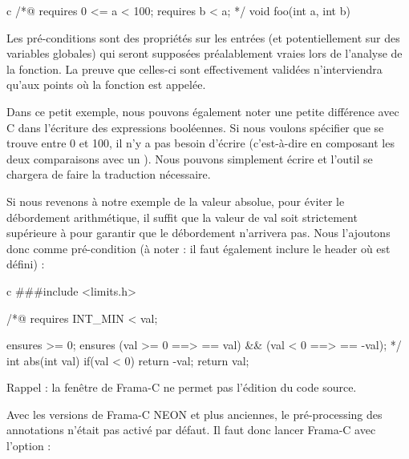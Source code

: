\documentclass[middle]{zmdocument}
\begin{document}
\begin{CodeBlock}{c}
/*@
  requires 0 <= a < 100;
  requires b < a;
*/
void foo(int a, int b){
  
}
\end{CodeBlock}



Les pré-conditions sont des propriétés sur les entrées (et potentiellement sur
des variables globales) qui seront supposées préalablement vraies lors de 
l'analyse de la fonction. La preuve que celles-ci sont effectivement validées 
n'interviendra qu'aux points où la fonction est appelée.



Dans ce petit exemple, nous pouvons également noter une petite différence avec 
C dans l'écriture des expressions booléennes. Si nous voulons spécifier 
que  se trouve entre 0 et 100, il n'y a pas besoin d'écrire 
(c'est-à-dire en composant les deux comparaisons avec un \CodeInline{\&\&}). Nous 
pouvons simplement écrire  et l'outil se chargera de faire
la traduction nécessaire.



Si nous revenons à notre exemple de la valeur absolue, pour éviter le 
débordement arithmétique, il suffit que la valeur de val soit strictement 
supérieure à  pour garantir que le débordement n'arrivera pas.
Nous l'ajoutons donc comme pré-condition (à noter : il faut également
inclure le header où  est défini) :



\begin{CodeBlock}{c}
###include <limits.h>

/*@
  requires INT_MIN < val;

  ensures \result >= 0;
  ensures (val >= 0 ==> \result == val) && 
          (val < 0 ==> \result == -val);
*/
int abs(int val){
  if(val < 0) return -val;
  return val;
}
\end{CodeBlock}



\begin{Warning}
Rappel : la fenêtre de Frama-C ne permet pas l'édition du code source.
\end{Warning}


\begin{Information}
Avec les versions de Frama-C NEON et plus anciennes, le pré-processing des
annotations n'était pas activé par défaut. Il faut donc lancer Frama-C avec
l'option  :

\end{Information}
\end{document}
